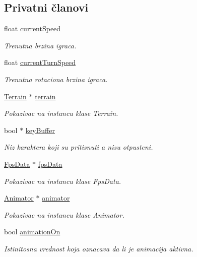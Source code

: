\subsection*{Privatni članovi}
\begin{DoxyCompactItemize}
\item 
float \hyperlink{classentity_1_1Player_a06f0a95dc0b0efc3299a07f90e91dd25}{current\+Speed}
\begin{DoxyCompactList}\small\item\em Trenutna brzina igraca. \end{DoxyCompactList}\item 
float \hyperlink{classentity_1_1Player_afaac869e93409af86a6f6fc53a95687e}{current\+Turn\+Speed}
\begin{DoxyCompactList}\small\item\em Trenutna rotaciona brzina igraca. \end{DoxyCompactList}\item 
\hyperlink{classterrain_1_1Terrain}{Terrain} $\ast$ \hyperlink{classentity_1_1Player_adc298ca7a3d8ab3528440489ed4ea60e}{terrain}
\begin{DoxyCompactList}\small\item\em Pokazivac na instancu klase Terrain. \end{DoxyCompactList}\item 
bool $\ast$ \hyperlink{classentity_1_1Player_ad36623cb0c52ae4dc97d73cbf1cd2134}{key\+Buffer}
\begin{DoxyCompactList}\small\item\em Niz karaktera koji su pritisnuti a nisu otpusteni. \end{DoxyCompactList}\item 
\hyperlink{classutility_1_1FpsData}{Fps\+Data} $\ast$ \hyperlink{classentity_1_1Player_a830db86853301f3619dd4416c52229e4}{fps\+Data}
\begin{DoxyCompactList}\small\item\em Pokazivac na instancu klase Fps\+Data. \end{DoxyCompactList}\item 
\hyperlink{classanimation_1_1Animator}{Animator} $\ast$ \hyperlink{classentity_1_1Player_a77d9fff91395b091561f81b9acd5f034}{animator}
\begin{DoxyCompactList}\small\item\em Pokazivac na instancu klase Animator. \end{DoxyCompactList}\item 
bool \hyperlink{classentity_1_1Player_a92fb9b7321096cd6dedbcc31b12cf011}{animation\+On}
\begin{DoxyCompactList}\small\item\em Istinitosna vrednost koja oznacava da li je animacija aktivna. \end{DoxyCompactList}\end{DoxyCompactItemize}


